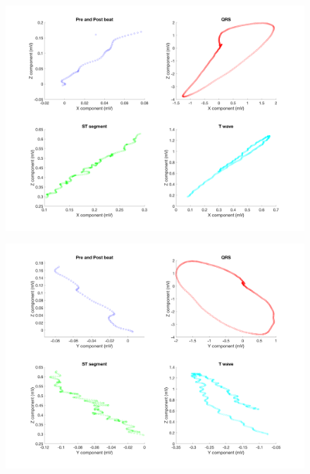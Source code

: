 \documentclass[12pt]{article}
\begin{document}
\begin{figure}[H]
	
	\centering
	\includegraphics[width = .95\textwidth]{Figures/FrankLeads_xz.png}
	\caption{ }
	\label{fig:Frank_xz}
\end{figure}

\begin{figure}[H]
	
	\centering
	\includegraphics[width = .95\textwidth]{Figures/FrankLeads_yz.png}
	\caption{ }
	\label{fig:Frank_yz}
\end{figure}
\end{document}
